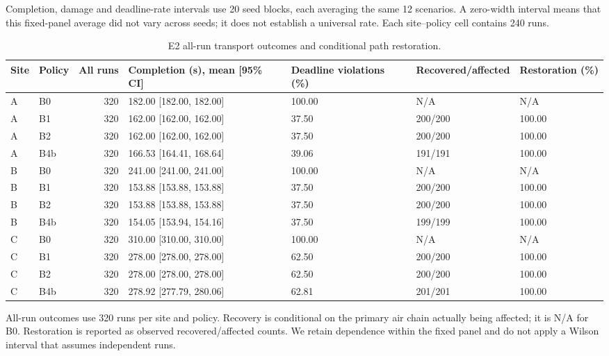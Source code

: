 \documentclass[11pt,a4paper]{article}
\begin{document}
Completion, damage and deadline-rate intervals use 20 seed blocks, each averaging the same 12 scenarios. A zero-width interval means that this fixed-panel average did not vary across seeds; it does not establish a universal rate. Each site--policy cell contains 240 runs.

\begin{table}[H]
\centering
\small
\setlength{\tabcolsep}{3pt}
\caption{E2 all-run transport outcomes and conditional path restoration.}
\label{tab:S2}
\begin{tabularx}{\textwidth}{@{}llrYYYY@{}}
\toprule
Site & Policy & All runs & Completion (s), mean [95\% CI] & Deadline violations (\%) & Recovered/affected & Restoration (\%) \\
\midrule
A & B0 & 320 & 182.00 [182.00, 182.00] & 100.00 & N/A & N/A \\
A & B1 & 320 & 162.00 [162.00, 162.00] & 37.50 & 200/200 & 100.00 \\
A & B2 & 320 & 162.00 [162.00, 162.00] & 37.50 & 200/200 & 100.00 \\
A & B4b & 320 & 166.53 [164.41, 168.64] & 39.06 & 191/191 & 100.00 \\
B & B0 & 320 & 241.00 [241.00, 241.00] & 100.00 & N/A & N/A \\
B & B1 & 320 & 153.88 [153.88, 153.88] & 37.50 & 200/200 & 100.00 \\
B & B2 & 320 & 153.88 [153.88, 153.88] & 37.50 & 200/200 & 100.00 \\
B & B4b & 320 & 154.05 [153.94, 154.16] & 37.50 & 199/199 & 100.00 \\
C & B0 & 320 & 310.00 [310.00, 310.00] & 100.00 & N/A & N/A \\
C & B1 & 320 & 278.00 [278.00, 278.00] & 62.50 & 200/200 & 100.00 \\
C & B2 & 320 & 278.00 [278.00, 278.00] & 62.50 & 200/200 & 100.00 \\
C & B4b & 320 & 278.92 [277.79, 280.06] & 62.81 & 201/201 & 100.00 \\
\bottomrule
\end{tabularx}
\end{table}

All-run outcomes use 320 runs per site and policy. Recovery is conditional on the primary air chain actually being affected; it is N/A for B0. Restoration is reported as observed recovered/affected counts. We retain dependence within the fixed panel and do not apply a Wilson interval that assumes independent runs.
\end{document}
